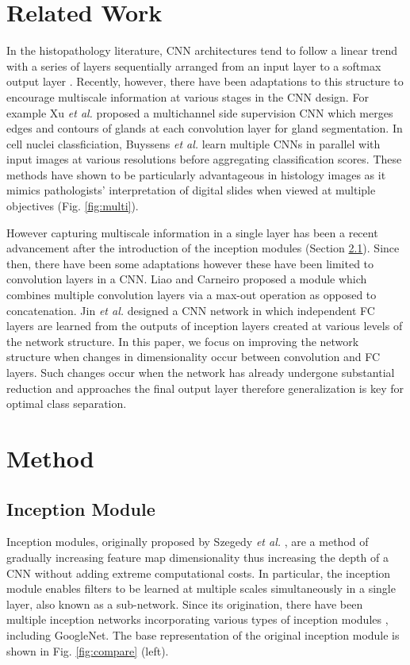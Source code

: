 \documentclass[runningheads,a4paper]{llncs}
\def\etal{\emph{et al. }}
\begin{document}
\section{Related Work}

In the histopathology literature, CNN architectures tend to follow a linear trend with a series of layers sequentially arranged from an input layer to a softmax output layer \cite{Spanhol2016,Litjens2016}. Recently, however, there have been adaptations to this structure to encourage multiscale information at various stages in the CNN design. For example Xu \etal \cite{Xu2016} proposed a multichannel side supervision CNN which merges edges and contours of glands at each convolution layer for gland segmentation. In cell nuclei classficiation, Buyssens \etal \cite{Buyssens2013} learn multiple CNNs in parallel with input images at  various resolutions before aggregating classification scores. These methods have shown to be particularly advantageous in histology images as it mimics pathologists' interpretation of digital slides when viewed at multiple objectives (Fig. \ref{fig:multi}).

However capturing multiscale information in a single layer has been a recent advancement after the introduction of the inception modules (Section \ref{sec:inceptiondesc}). Since then, there have been some adaptations however these have been limited to convolution layers in a CNN. Liao and Carneiro \cite{Liao2015} proposed a module which combines multiple convolution layers via a max-out operation as opposed to concatenation. Jin \etal \cite{Jin2016} designed a CNN network in which independent FC layers are learned from the outputs of inception layers created at various levels of the network structure. In this paper, we focus on improving the network structure when changes in dimensionality occur between convolution and FC layers. Such changes occur when the network has already undergone substantial reduction and approaches the final output layer therefore generalization is key for optimal class separation.


\section{Method}

\subsection{Inception Module}
\label{sec:inceptiondesc}

Inception modules, originally proposed by Szegedy \etal \cite{Szegedy2015}, are a method of gradually increasing feature map dimensionality thus increasing the depth of a CNN without adding extreme computational costs. In particular, the inception module enables filters to be learned at multiple scales simultaneously in a single layer, also known as a sub-network. Since its origination, there have been multiple inception networks incorporating various types of inception modules \cite{Szegedy2016,Szegedy2016b}, including GoogleNet. The base representation of the original inception module is shown in Fig. \ref{fig:compare} (left). 
\end{document}
